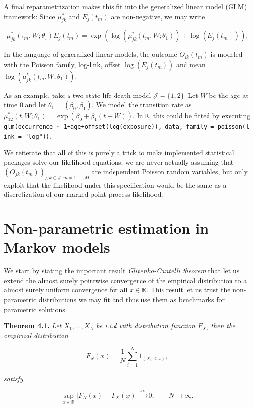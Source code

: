 \documentclass[a4paper,10pt,openany]{book}
\begin{document}
A final reparametrization makes this fit into the generalized linear model (GLM) framework: Since \(\mu^*_{jk}\) and \(E_j(t_m)\) are non-negative, we may write

\[
\mu^*_{jk}(t_m,W;\theta_1)E_j(t_m)=\exp\left(\log\left(\mu^*_{jk}(t_m,W;\theta_1)\right)+\log\left(E_j(t_m)\right)\right).
\]

In the language of generalized linear models, the outcome \(O_{jk}(t_m)\) is modeled with the Poisson family, log-link, offset \(\log(E_j(t_m))\) and mean \(\log(\mu^*_{jk}(t_m,W;\theta_1))\).

As an example, take a two-state life-death model \(\mathcal J = \{1, 2\}\). Let \(W\) be the age at time 0 and let \(\theta_1 =(\beta_0,\beta_1)\). We model the transition rate as \(\mu^*_{12}(t,W;\theta_1)=\exp(\beta_0+\beta_1(t+W))\). In \texttt{R}, this could be fitted by executing \texttt{glm(occurrence\ ∼\ 1+age+offset(log(exposure)),\ data,\ family\ =\ poisson(link\ =\ "log"))}.

We reiterate that all of this is purely a trick to make implemented statistical packages solve our likelihood equations; we are never actually assuming that \((O_{jk}(t_m))_{j,k\in\mathcal J,m=1,...,M}\) are independent Poisson random variables, but only exploit that the likelihood under this specification would be the same as a discretization of our marked point process likelihood.

\hypertarget{non-parametric-estimation-in-markov-models}{%
\section{Non-parametric estimation in Markov models}\label{non-parametric-estimation-in-markov-models}}

We start by stating the important result \emph{Glivenko-Cantelli theorem} that let us extend the almost surely pointwise convergence of the empirical distribution to a almost surely uniform convergence for all \(x\in\mathbb R\). This result let us trust the non-parametric distributions we may fit and thus use them as benchmarks for parametric solutions.

\textbf{Theorem 4.1.} \emph{Let \(X_1,...,X_N\) be i.i.d with distribution function \(F_X\), then the empirical distribution}

\[
F_N(x)=\frac{1}{N}\sum_{i=1}^N 1_{(X_i\le x)},
\]

\emph{satisfy}

\[
\sup_{x\in\mathbb R}\left\vert F_N(x)-F_X(x)\right\vert\stackrel{\text{a.s.}}{\to}0,\qquad N\to \infty.
\]
\end{document}
